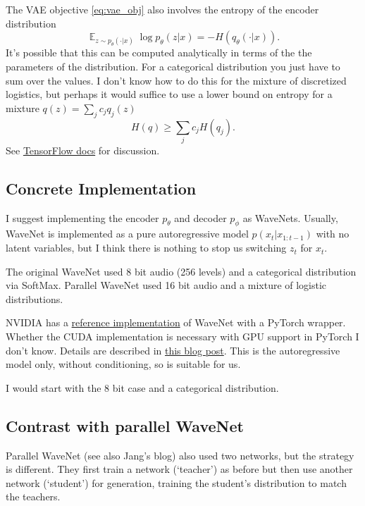 \documentclass[preprint,notitlepage]{revtex4-1}
\DeclareMathOperator*{\E}{\mathbb{E}}
\begin{document}
The VAE objective \eqref{eq:vae_obj} also involves the entropy of the encoder distribution
%
\begin{equation}
  \E_{z \sim p_\theta(\cdot|x)} \log p_\theta(z|x) = - H(q_\theta(\cdot|x)).
\end{equation}
%
It's possible that this can be computed analytically in terms of the the parameters of the distribution. For a categorical distribution you just have to sum over the values.  I don't know how to do this for the mixture of discretized logistics, but perhaps it would suffice to use a lower bound on entropy for a mixture $q(z)=\sum_j c_j q_j(z)$
%
\begin{equation}
  H(q)\geq \sum_j c_j H(q_j).
\end{equation}
%
See \href{https://www.tensorflow.org/probability/api_docs/python/tfp/distributions/Mixture#entropy}{TensorFlow docs} for discussion.
%

\subsection{Concrete Implementation}

I suggest implementing the encoder $p_\theta$ and decoder $p_\phi$ as WaveNets. Usually, WaveNet is implemented as a pure autoregressive model $p(x_t|x_{1:t-1})$ with no latent variables, but I think there is nothing to stop us switching $z_t$ for $x_t$.

The original WaveNet \cite{Oord:2016aa} used 8 bit audio (256 levels) and a categorical distribution via SoftMax. Parallel WaveNet \cite{Oord:2017aa} used 16 bit audio and a mixture of logistic distributions.

NVIDIA has a \href{https://github.com/NVIDIA/nv-wavenet}{reference implementation} of WaveNet with a PyTorch wrapper. Whether the CUDA implementation is necessary with GPU support in PyTorch I don't know. Details are described in \href{https://devblogs.nvidia.com/nv-wavenet-gpu-speech-synthesis/}{this blog post}. This is the autoregressive model only, without conditioning, so is suitable for us.

I would start with the 8 bit case and a categorical distribution.

\subsection{Contrast with parallel WaveNet}

Parallel WaveNet \cite{Oord:2017aa} (see also Jang's blog) also used two networks, but the strategy is different. They first train a network (`teacher') as before but then use another network (`student') for generation, training the student's distribution to match the teachers.
\end{document}
